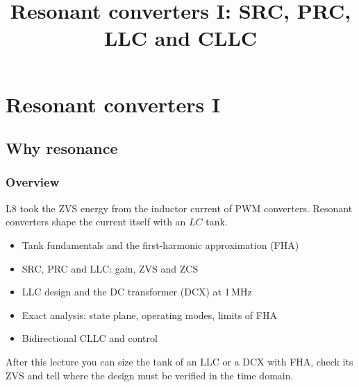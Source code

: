 \title[Resonant converters I]{Resonant converters I: SRC, PRC, LLC and CLLC}
\section{Resonant converters I}

\begin{frame}[plain]
	\titlepage
\end{frame}

\subsection{Why resonance}

\begin{frame}
	\frametitle{Overview}
	L8 took the ZVS energy from the inductor current of PWM converters. Resonant converters shape the current itself with an $LC$ tank.
	\begin{itemize}
		\item Tank fundamentals and the first-harmonic approximation (FHA)
		\item SRC, PRC and LLC: gain, ZVS and ZCS
		\item LLC design and the DC transformer (DCX) at 1\,MHz
		\item Exact analysis: state plane, operating modes, limits of FHA
		\item Bidirectional CLLC and control
	\end{itemize}
	After this lecture you can size the tank of an LLC or a DCX with FHA, check its ZVS and tell where the design must be verified in the time domain.
\end{frame}

